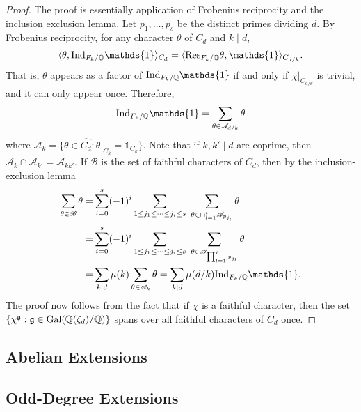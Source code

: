 \begin{proof}
    The proof is essentially application of Frobenius reciprocity and the inclusion exclusion lemma. Let $p_1,\ldots,p_s$ be the distinct primes dividing $d$. By Frobenius reciprocity, for any character $\theta$ of $C_d$ and $k\mid d$,
    $$\langle\theta,\Ind_{F_k/\QQ}\mathds{1}\rangle_{C_d}=\langle\Res_{F_k/\QQ}\theta,\mathds{1}\rangle_{C_{d/k}}.$$
    That is, $\theta$ appears as a factor of $\Ind_{F_k/\QQ}\mathds{1}$ if and only if $\chi|_{C_{d/k}}$ is trivial, and it can only appear once. Therefore,
    $$\Ind_{F_k/\QQ}\mathds{1}=\sum_{\theta\in\mathcal{A}_{d/k}}\theta$$
    where $\mathcal{A}_k=\{\theta\in\widehat{C_d}:\theta|_{C_{k}}=\mathds{1}_{C_{k}}\}$. Note that if $k,k'\mid d$ are coprime, then $\mathcal{A}_k\cap\mathcal{A}_{k'}=\mathcal{A}_{kk'}$. If $\mathcal{B}$ is the set of faithful characters of $C_d$, then by the inclusion-exclusion lemma
    \begin{align*}
        \sum_{\theta\in\mathcal{B}}\theta=&\sum_{i=0}^s(-1)^i\sum_{1\leq j_1\leq\dots\leq j_i\leq s}\ \sum_{\theta\in\cap_{l=1}^i\mathcal{A}_{p_{j_l}}}\theta\\
        =&\sum_{i=0}^s(-1)^i\sum_{1\leq j_1\leq\dots\leq j_i\leq s}\ \sum_{\theta\in\mathcal{A}_{\prod_{l=1}^i p_{j_l}}}\theta\\
        =&\sum_{k\mid d}\mu(k)\sum_{\theta\in\mathcal{A}_k}\theta=\sum_{k\mid d}\mu(d/k)\Ind_{F_k/\QQ}\mathds{1}.
    \end{align*}
    The proof now follows from the fact that if $\chi$ is a faithful character, then the set $\{\chi^{\mathfrak{g}}:\mathfrak{g}\in\mathrm{Gal}(\mathbb{Q}(\zeta_d)/\mathbb{Q})\}$ spans over all faithful characters of $C_d$ once. 
\end{proof}


\subsection{Abelian Extensions}

\subsection{Odd-Degree Extensions}